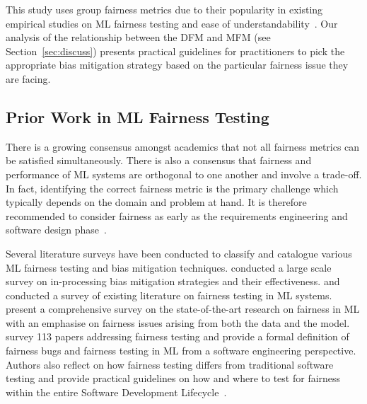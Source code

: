 \documentclass[sigconf,review,anonymous]{acmart}
\begin{document}
This study uses group fairness metrics due to their popularity in
existing empirical studies on ML fairness testing and ease of
understandability \cite{zhang2021ignorance,biswas2020machine,biswas2021fair,hort2021fairea,chakraborty2021bias}. Our
analysis of the relationship between the DFM and MFM (see
Section \ref{sec:discuss}) presents practical guidelines for
practitioners to pick the appropriate bias mitigation strategy based
on the particular fairness issue they are facing.

\subsection{Prior Work in ML Fairness Testing}\label{sec:prior-work}

There is a growing consensus amongst academics that not all fairness
metrics can be satisfied simultaneously. There is also a consensus
that fairness and performance of ML systems are orthogonal to one
another and involve a trade-off. In fact, identifying the correct
fairness metric is the primary challenge which typically depends on
the domain and problem at hand. It is therefore recommended to
consider fairness as early as the requirements engineering and
software design
phase \cite{zhang2020machine,chen2022fairness,mehrabi2021survey,zhang2021ignorance}.

Several literature surveys have been conducted to classify and
catalogue various ML fairness testing and bias mitigation techniques.
\citeauthor{wan2021modeling} conducted a large scale survey on
in-processing bias mitigation strategies and their effectiveness.
\citeauthor{chen2022fairness} and \citeauthor{mehrabi2021survey}
conducted a survey of existing literature on fairness testing in ML
systems. \citeauthor{mehrabi2021survey} present a comprehensive survey
on the state-of-the-art research on fairness in ML with an emphasise
on fairness issues arising from both the data and the model.
\citeauthor{chen2022fairness} survey 113 papers addressing fairness
testing and provide a formal definition of fairness bugs and fairness
testing in ML from a software engineering perspective. Authors also reflect on how
fairness testing differs from traditional software testing and provide
practical guidelines on how and where to test for fairness within the
entire Software Development
Lifecycle \cite{wan2021modeling,chen2022fairness,mehrabi2021survey}.
\end{document}
